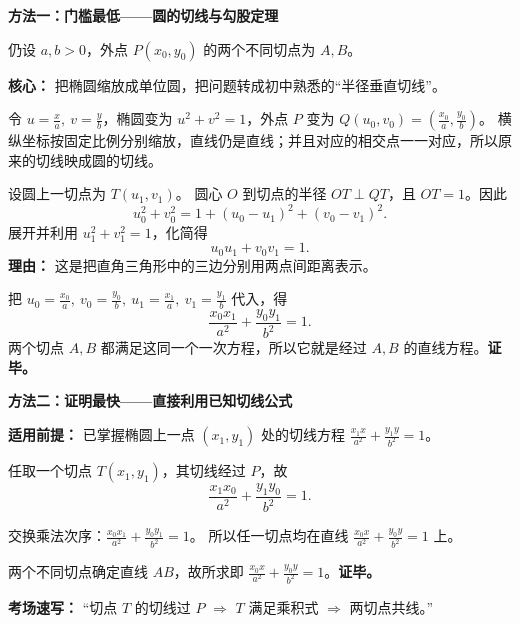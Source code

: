 \clearpage
\begin{proofbox}
    \textbf{\textcolor{CProof}{方法一：门槛最低——圆的切线与勾股定理}}



    仍设 $a,b>0$，外点 $P(x_0,y_0)$ 的两个不同切点为 $A,B$。

    \textbf{核心：} 把椭圆缩放成单位圆，把问题转成初中熟悉的``半径垂直切线''。
    \begin{description}[style=nextline, leftmargin=2.8em, labelsep=0.5em, itemsep=0.4em]
        \item[\textbf{第1步（缩放成圆）：}] 令 $u=\frac xa,\ v=\frac yb$，椭圆变为 $u^2+v^2=1$，外点
        $P$ 变为 $Q(u_0,v_0)=(\frac{x_0}{a},\frac{y_0}{b})$。
        横纵坐标按固定比例分别缩放，直线仍是直线；并且对应的相交点一一对应，所以原来的切线映成圆的切线。

        \item[\textbf{第2步（使用勾股定理）：}] 设圆上一切点为 $T(u_1,v_1)$。
        圆心 $O$ 到切点的半径 $OT\perp QT$，且 $OT=1$。因此
        \[
            u_0^2+v_0^2=1+(u_0-u_1)^2+(v_0-v_1)^2.
        \]
        展开并利用 $u_1^2+v_1^2=1$，化简得
        \[
            \boxed{u_0u_1+v_0v_1=1}.
        \]
        \textbf{理由：} 这是把直角三角形中的三边分别用两点间距离表示。

        \item[\textbf{第3步（换回椭圆坐标）：}] 把
        $u_0=\frac{x_0}{a},\ v_0=\frac{y_0}{b},\ u_1=\frac{x_1}{a},\ v_1=\frac{y_1}{b}$
        代入，得
        \[
            \frac{x_0x_1}{a^2}+\frac{y_0y_1}{b^2}=1.
        \]
        两个切点 $A,B$ 都满足这同一个一次方程，所以它就是经过 $A,B$ 的直线方程。\textbf{证毕。}
    \end{description}

\end{proofbox}
\clearpage
\begin{proofbox}
    \textbf{\textcolor{CProof}{方法二：证明最快——直接利用已知切线公式}}



    \textbf{适用前提：} 已掌握椭圆上一点 $(x_1,y_1)$ 处的切线方程
    $\frac{x_1x}{a^2}+\frac{y_1y}{b^2}=1$。
    \begin{description}[style=nextline, leftmargin=2.8em, labelsep=0.5em, itemsep=0.35em]
        \item[\textbf{第1步：}] 任取一个切点 $T(x_1,y_1)$，其切线经过 $P$，故
        \[
            \frac{x_1x_0}{a^2}+\frac{y_1y_0}{b^2}=1.
        \]
        \item[\textbf{第2步：}] 交换乘法次序：$\frac{x_0x_1}{a^2}+\frac{y_0y_1}{b^2}=1$。
        所以任一切点均在直线 $\frac{x_0x}{a^2}+\frac{y_0y}{b^2}=1$ 上。
        \item[\textbf{第3步：}] 两个不同切点确定直线 $AB$，故所求即
        $\boxed{\frac{x_0x}{a^2}+\frac{y_0y}{b^2}=1}$。\textbf{证毕。}
    \end{description}
    \textbf{考场速写：} ``切点 $T$ 的切线过 $P$ $\Rightarrow$ $T$ 满足乘积式 $\Rightarrow$ 两切点共线。''

\end{proofbox}
